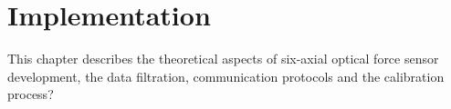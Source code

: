 \chapter{Implementation}
\label{chapter:implementation}

This chapter describes the theoretical aspects of six-axial optical force sensor development, the data filtration, communication protocols and the calibration process?












